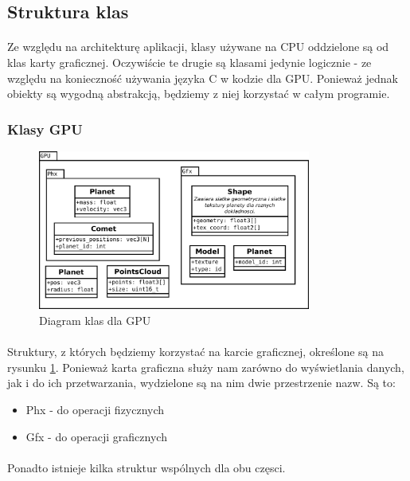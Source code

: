 \subsection{Struktura klas}\label{sub:struktura klas}
\paragraph{}
Ze względu na architekturę aplikacji, klasy używane na CPU oddzielone są od klas karty graficznej. Oczywiście te drugie są klasami jedynie logicznie - ze względu na konieczność używania języka C w kodzie dla GPU. Ponieważ jednak obiekty są wygodną abstrakcją, będziemy z niej korzystać w całym programie.

\subsubsection{Klasy GPU}

\begin{figure}[h]
	\centering
	\includegraphics[angle=0,width=0.8\textwidth]{img/class_gpu.pdf}
	\caption{Diagram klas dla GPU}
	\label{fig:class_gpu}
\end{figure}

\paragraph{}
Struktury, z których będziemy korzystać na karcie graficznej, określone są na rysunku \ref{fig:class_gpu}. Ponieważ karta graficzna służy nam zarówno do wyświetlania danych, jak i do ich przetwarzania, wydzielone są na nim dwie przestrzenie nazw. Są to:
\begin{itemize}
	\item{Phx - do operacji fizycznych}
	\item{Gfx - do operacji graficznych}
\end{itemize}

\paragraph{}
Ponadto istnieje kilka struktur wspólnych dla obu częsci.

